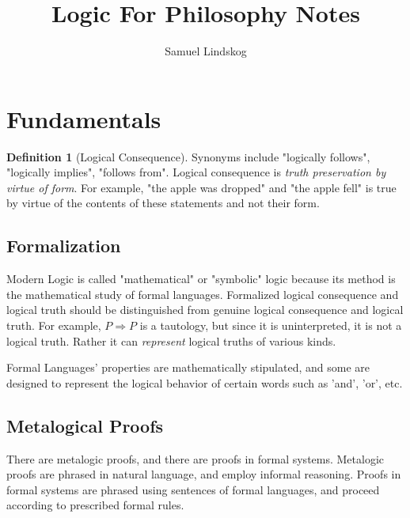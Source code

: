 \documentclass[nobib,notoc]{tufte-handout}
\begin{document}
\theoremstyle{definition}\newtheorem{defi}{Definition}[section]
\theoremstyle{definition}\newtheorem{thm}{Theorem}[section]
\theoremstyle{definition}\newtheorem{cor}{Corollary}
\theoremstyle{definition}\newtheorem{lem}{Lemma}[section]
\theoremstyle{remark}\newtheorem*{notat}{Notation}

\title{Logic For Philosophy Notes}
\author{Samuel Lindskog}
\maketitle

\setcounter{section}{1}
\setcounter{tocdepth}{1}

\section{Fundamentals}
\begin{defi}[Logical Consequence]
	Synonyms include "logically follows", "logically implies", "follows from". Logical consequence is \emph{truth preservation by virtue of form}. For example, "the apple was dropped" and "the apple fell" is true by virtue of the contents of these statements and not their form.
\end{defi}
\subsection{Formalization}
Modern Logic is called "mathematical" or "symbolic" logic because its method is the mathematical study of formal languages. Formalized logical consequence and logical truth should be distinguished from genuine logical consequence and logical truth. For example, \(P\Rightarrow P\) is a tautology, but since it is uninterpreted, it is not a logical truth. Rather it can \emph{represent} logical truths of various kinds.\par
Formal Languages' properties are mathematically stipulated, and some are designed to represent the logical behavior of certain words such as 'and', 'or', etc.
\subsection{Metalogical Proofs}
There are metalogic proofs, and there are proofs in formal systems. Metalogic proofs are phrased in natural language, and employ informal reasoning. Proofs in formal systems are phrased using sentences of formal languages, and proceed according to prescribed formal rules.
\end{document}
